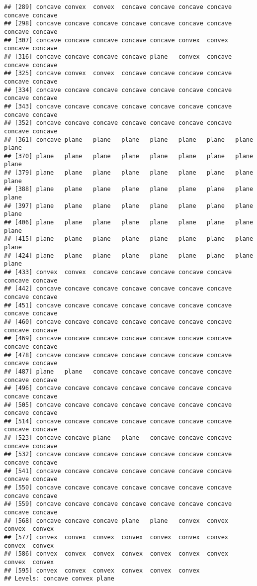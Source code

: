 \documentclass[
]{article}
\begin{document}
\begin{verbatim}
## [289] concave convex  convex  concave concave concave concave concave concave
## [298] concave concave concave concave concave concave concave concave concave
## [307] concave concave concave concave concave convex  convex  concave concave
## [316] concave concave concave concave plane   convex  concave concave concave
## [325] concave convex  convex  concave concave concave concave concave concave
## [334] concave concave concave concave concave concave concave concave concave
## [343] concave concave concave concave concave concave concave concave concave
## [352] concave concave concave concave concave concave concave concave concave
## [361] concave plane   plane   plane   plane   plane   plane   plane   plane  
## [370] plane   plane   plane   plane   plane   plane   plane   plane   plane  
## [379] plane   plane   plane   plane   plane   plane   plane   plane   plane  
## [388] plane   plane   plane   plane   plane   plane   plane   plane   plane  
## [397] plane   plane   plane   plane   plane   plane   plane   plane   plane  
## [406] plane   plane   plane   plane   plane   plane   plane   plane   plane  
## [415] plane   plane   plane   plane   plane   plane   plane   plane   plane  
## [424] plane   plane   plane   plane   plane   plane   plane   plane   plane  
## [433] convex  convex  concave concave concave concave concave concave concave
## [442] concave concave concave concave concave concave concave concave concave
## [451] concave concave concave concave concave concave concave concave concave
## [460] concave concave concave concave concave concave concave concave concave
## [469] concave concave concave concave concave concave concave concave concave
## [478] concave concave concave concave concave concave concave concave concave
## [487] plane   plane   concave concave concave concave concave concave concave
## [496] concave concave concave concave concave concave concave concave concave
## [505] concave concave concave concave concave concave concave concave concave
## [514] concave concave concave concave concave concave concave concave concave
## [523] concave concave plane   plane   concave concave concave concave concave
## [532] concave concave concave concave concave concave concave concave concave
## [541] concave concave concave concave concave concave concave concave concave
## [550] concave concave concave concave concave concave concave concave concave
## [559] concave concave concave concave concave concave concave concave concave
## [568] concave concave concave plane   plane   convex  convex  convex  convex 
## [577] convex  convex  convex  convex  convex  convex  convex  convex  convex 
## [586] convex  convex  convex  convex  convex  convex  convex  convex  convex 
## [595] convex  convex  convex  convex  convex  convex 
## Levels: concave convex plane
\end{verbatim}
\end{document}
